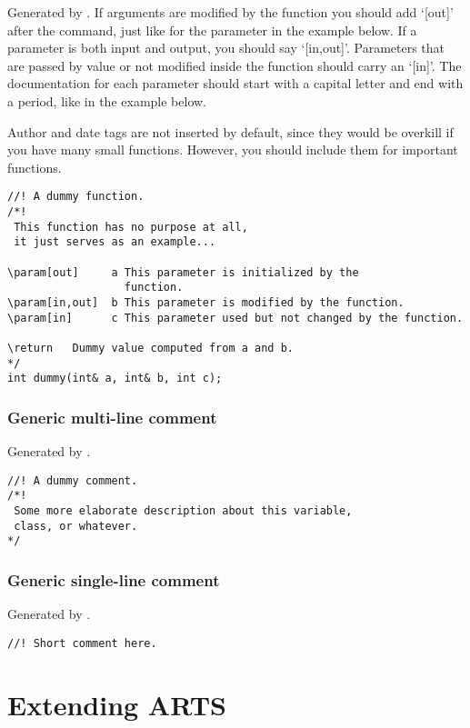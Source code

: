 Generated by . If
arguments are modified by the function you should add `[out]' after
the  command, just like for the parameter
 in the example below. If a parameter is both input and
output, you should say `[in,out]'. Parameters that are passed by
value or not modified inside the function should carry an `[in]'. The
documentation for each parameter should start with a capital letter and
end with a period, like in the example below.

Author and date tags are not inserted by default, since they would be
overkill if you have many small functions. However, you should include
them for important functions. 

\begin{verbatim}
//! A dummy function.
/*! 
 This function has no purpose at all,
 it just serves as an example... 

\param[out]     a This parameter is initialized by the
                  function.
\param[in,out]  b This parameter is modified by the function.
\param[in]      c This parameter used but not changed by the function.

\return   Dummy value computed from a and b.         
*/
int dummy(int& a, int& b, int c);
\end{verbatim}

\subsubsection{Generic multi-line comment}

Generated by .

\begin{verbatim}
//! A dummy comment.
/*! 
 Some more elaborate description about this variable, 
 class, or whatever. 
*/
\end{verbatim}

\subsubsection{Generic single-line comment}

Generated by .

\begin{verbatim}
//! Short comment here.
\end{verbatim}


\section{Extending ARTS}
 \label{sec:development:extending}


